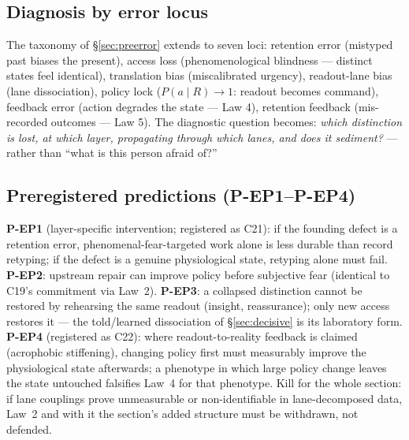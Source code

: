 \documentclass[9pt,twocolumn]{article}
\begin{document}
\subsection{Diagnosis by error locus}
The taxonomy of \S\ref{sec:preerror} extends to seven loci: retention error (mistyped past biases the present), access loss (phenomenological blindness --- distinct states feel identical), translation bias (miscalibrated urgency), readout-lane bias (lane dissociation), policy lock ($P(a\mid R)\to1$: readout becomes command), feedback error (action degrades the state --- Law 4), retention feedback (mis-recorded outcomes --- Law 5). The diagnostic question becomes: \emph{which distinction is lost, at which layer, propagating through which lanes, and does it sediment?} --- rather than ``what is this person afraid of?''

\subsection{Preregistered predictions (P-EP1--P-EP4)}
\textbf{P-EP1} (layer-specific intervention; registered as C21): if the founding defect is a retention error, phenomenal-fear-targeted work alone is less durable than record retyping; if the defect is a genuine physiological state, retyping alone must fail. \textbf{P-EP2}: upstream repair can improve policy before subjective fear (identical to C19's commitment via Law~2). \textbf{P-EP3}: a collapsed distinction cannot be restored by rehearsing the same readout (insight, reassurance); only new access restores it --- the told/learned dissociation of \S\ref{sec:decisive} is its laboratory form. \textbf{P-EP4} (registered as C22): where readout-to-reality feedback is claimed (acrophobic stiffening), changing policy first must measurably improve the physiological state afterwards; a phenotype in which large policy change leaves the state untouched falsifies Law~4 for that phenotype. Kill for the whole section: if lane couplings prove unmeasurable or non-identifiable in lane-decomposed data, Law~2 and with it the section's added structure must be withdrawn, not defended.
\end{document}
